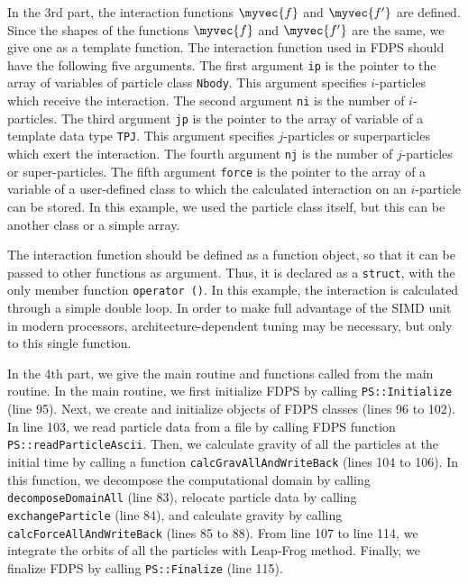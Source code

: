 In the 3rd part, the interaction functions $\myvec{f}$ and
$\myvec{f'}$ are defined. Since the shapes of the functions
$\myvec{f}$ and $\myvec{f'}$ are the same, we give one as a template
function.  The interaction function used in FDPS should have the
following five arguments. The first argument \texttt{ip} is the
pointer to the array of variables of particle
class \texttt{Nbody}. This argument specifies $i$-particles which
receive the interaction. The second argument \texttt{ni} is the number
of $i$-particles. The third argument \texttt{jp} is the pointer to the
array of variable of a template data type \texttt{TPJ}. This argument
specifies $j$-particles or superparticles which exert the
interaction. The fourth argument \texttt{nj} is the number of
$j$-particles or super-particles. The fifth argument \texttt{force} is
the pointer to the array of a variable of a user-defined class to
which the calculated interaction on an $i$-particle can be stored. In
this example, we used the particle class itself, but this can be
another class or a simple array.

%
The interaction function should be defined as a function object, so
that it can be passed to other functions as argument. Thus, it is
declared as a \texttt{struct}, with the only member
function \texttt{operator ()}.  In this example, the interaction is
calculated through a simple double loop. In order to make full
advantage of the SIMD unit in modern processors,
architecture-dependent tuning may be necessary, but only to this
single function.

In the 4th part, we give the main routine and functions called from
the main routine. In the main routine, we first initialize FDPS by
calling \texttt{PS::Initialize} (line 95). Next, we create and
initialize objects of FDPS classes (lines 96 to 102). In line 103, we
read particle data from a file by calling FDPS
function \texttt{PS::readParticleAscii}. Then, we calculate gravity of
all the particles at the initial time by calling a
function \texttt{calcGravAllAndWriteBack} (lines 104 to 106). In this
function, we decompose the computational domain by
calling \texttt{decomposeDomainAll} (line 83), relocate particle data
by calling \texttt{exchangeParticle} (line 84), and calculate gravity
by calling \texttt{calcForceAllAndWriteBack} (lines 85 to 88). From
line 107 to line 114, we integrate the orbits of all the particles
with Leap-Frog method. Finally, we finalize FDPS by
calling \texttt{PS::Finalize} (line 115).

